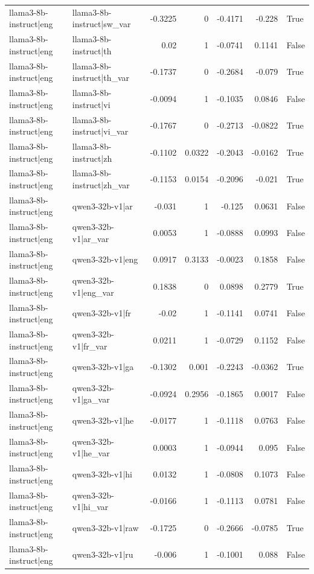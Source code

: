 \begin{table}
\begin{tabular}{l l r r r r l}
llama3-8b-instruct|eng & llama3-8b-instruct|sw_var & -0.3225 & 0 & -0.4171 & -0.228 & True \\
llama3-8b-instruct|eng & llama3-8b-instruct|th & 0.02 & 1 & -0.0741 & 0.1141 & False \\
llama3-8b-instruct|eng & llama3-8b-instruct|th_var & -0.1737 & 0 & -0.2684 & -0.079 & True \\
llama3-8b-instruct|eng & llama3-8b-instruct|vi & -0.0094 & 1 & -0.1035 & 0.0846 & False \\
llama3-8b-instruct|eng & llama3-8b-instruct|vi_var & -0.1767 & 0 & -0.2713 & -0.0822 & True \\
llama3-8b-instruct|eng & llama3-8b-instruct|zh & -0.1102 & 0.0322 & -0.2043 & -0.0162 & True \\
llama3-8b-instruct|eng & llama3-8b-instruct|zh_var & -0.1153 & 0.0154 & -0.2096 & -0.021 & True \\
llama3-8b-instruct|eng & qwen3-32b-v1|ar & -0.031 & 1 & -0.125 & 0.0631 & False \\
llama3-8b-instruct|eng & qwen3-32b-v1|ar_var & 0.0053 & 1 & -0.0888 & 0.0993 & False \\
llama3-8b-instruct|eng & qwen3-32b-v1|eng & 0.0917 & 0.3133 & -0.0023 & 0.1858 & False \\
llama3-8b-instruct|eng & qwen3-32b-v1|eng_var & 0.1838 & 0 & 0.0898 & 0.2779 & True \\
llama3-8b-instruct|eng & qwen3-32b-v1|fr & -0.02 & 1 & -0.1141 & 0.0741 & False \\
llama3-8b-instruct|eng & qwen3-32b-v1|fr_var & 0.0211 & 1 & -0.0729 & 0.1152 & False \\
llama3-8b-instruct|eng & qwen3-32b-v1|ga & -0.1302 & 0.001 & -0.2243 & -0.0362 & True \\
llama3-8b-instruct|eng & qwen3-32b-v1|ga_var & -0.0924 & 0.2956 & -0.1865 & 0.0017 & False \\
llama3-8b-instruct|eng & qwen3-32b-v1|he & -0.0177 & 1 & -0.1118 & 0.0763 & False \\
llama3-8b-instruct|eng & qwen3-32b-v1|he_var & 0.0003 & 1 & -0.0944 & 0.095 & False \\
llama3-8b-instruct|eng & qwen3-32b-v1|hi & 0.0132 & 1 & -0.0808 & 0.1073 & False \\
llama3-8b-instruct|eng & qwen3-32b-v1|hi_var & -0.0166 & 1 & -0.1113 & 0.0781 & False \\
llama3-8b-instruct|eng & qwen3-32b-v1|raw & -0.1725 & 0 & -0.2666 & -0.0785 & True \\
llama3-8b-instruct|eng & qwen3-32b-v1|ru & -0.006 & 1 & -0.1001 & 0.088 & False \\

\end{tabular}
\end{table}
